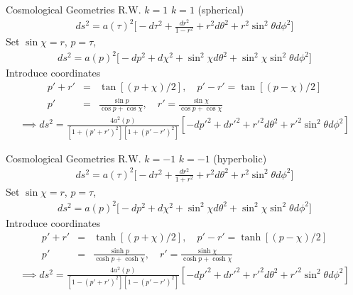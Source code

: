 \documentclass[8pt]{beamer}
\begin{document}

\begin{frame}{Cosmological Geometries R.W. $k=1$}
	$k=1$ (spherical)
	\begin{eqnarray*}
		ds^2 = a(\tau)^2\bigg[-d\tau^2 + \frac{dr^2}{1-r^2} + r^2 d\theta^2 + r^2 \sin^2\theta d\phi^2\bigg]
	\end{eqnarray*}	
	Set $\sin\chi = r$, $p = \tau$, 
	\begin{eqnarray*}
		ds^2 = a(p)^2\bigg[-dp^2 + d\chi^2 + \sin^2\chi d\theta^2 + \sin^2\chi \sin^2\theta d\phi^2\bigg]
	\end{eqnarray*}
	Introduce coordinates
	\begin{eqnarray*}
			p' + r' &=& \tan[(p+\chi)/2],\quad p'-r'=\tan[(p-\chi)/2]
			\nonumber\\
			p' &=& \frac{\sin p}{\cos p + \cos \chi}, \quad r' = \frac{\sin\chi}{\cos p + \cos\chi}
	\end{eqnarray*}
	\begin{eqnarray*}
	\implies ds^2 = \frac{4a^2(p)}{[1+(p'+r')^2][1+(p'-r')^2]}[-dp'^2 + dr'^2 +r'^2 d\theta^2 + r'^2\sin^2\theta d\phi^2]
	\end{eqnarray*}
\end{frame}


\begin{frame}{Cosmological Geometries R.W. $k=-1$}
	$k=-1$ (hyperbolic)
	\begin{eqnarray*}
		ds^2 = a(\tau)^2\bigg[-d\tau^2 + \frac{dr^2}{1+r^2}  + r^2 d\theta^2 + r^2 \sin^2\theta d\phi^2\bigg]
	\end{eqnarray*}	
	Set $\sin\chi = r$, $p = \tau$, 
	\begin{eqnarray*}
		ds^2 = a(p)^2\bigg[-dp^2 + d\chi^2 + \sin^2\chi d\theta^2 + \sin^2\chi \sin^2\theta d\phi^2\bigg]
	\end{eqnarray*}
	Introduce coordinates
	\begin{eqnarray*}
		p' + r' &=& \tanh[(p+\chi)/2],\quad p'-r'=\tanh[(p-\chi)/2]
		\nonumber\\
		p' &=& \frac{\sinh p}{\cosh p + \cosh \chi}, \quad r' = \frac{\sinh\chi}{\cosh p + \cosh\chi}
	\end{eqnarray*}
	\begin{eqnarray*}
	\implies ds^2 = \frac{4a^2(p)}{[1-(p'+r')^2][1-(p'-r')^2]}[-dp'^2 + dr'^2 +r'^2 d\theta^2 + r'^2\sin^2\theta d\phi^2]
	\end{eqnarray*}
\end{frame}
\end{document}
